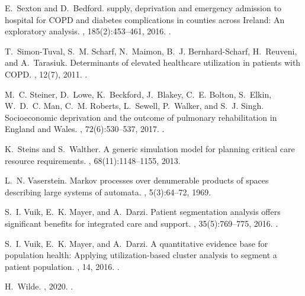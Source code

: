 \documentclass[11pt]{article}
\begin{document}
\begin{thebibliography}{10}
E.~Sexton and D.~Bedford.
 supply, deprivation and emergency admission to hospital for
  {COPD} and diabetes complications in counties across {Ireland}: An
  exploratory analysis.
, 185(2):453--461, 2016.
\newblock \href {https://doi.org/10.1007/s11845-015-1359-5}
  {}.

T.~Simon-Tuval, S.~M. Scharf, N.~Maimon, B.~J. Bernhard-Scharf, H.~Reuveni, and
  A.~Tarasiuk.
\newblock Determinants of elevated healthcare utilization in patients with
  {COPD}.
, 12(7), 2011.
\newblock \href {https://doi.org/10.1186/1465-9921-12-7}
  {}.

M.~C. Steiner, D.~Lowe, K.~Beckford, J.~Blakey, C.~E. Bolton, S.~Elkin,
  W.~D.~C. Man, C.~M. Roberts, L.~Sewell, P.~Walker, and S.~J. Singh.
\newblock Socioeconomic deprivation and the outcome of pulmonary rehabilitation
  in {England} and {Wales}.
, 72(6):530--537, 2017.
\newblock \href {https://doi.org/10.1136/thoraxjnl-2016-209376}
  {}.

K.~Steins and S.~Walther.
\newblock A generic simulation model for planning critical care resource
  requirements.
, 68(11):1148--1155, 2013.

L.~N. Vaserstein.
\newblock Markov processes over denumerable products of spaces describing large
  systems of automata.
, 5(3):64--72, 1969.

S.~I. Vuik, E.~K. Mayer, and A.~Darzi.
\newblock Patient segmentation analysis offers significant benefits for
  integrated care and support.
, 35(5):769--775, 2016.
\newblock \href {https://doi.org/10.1377/hlthaff.2015.1311}
  {}.

S.~I. Vuik, E.~K. Mayer, and A.~Darzi.
\newblock A quantitative evidence base for population health: Applying
  utilization-based cluster analysis to segment a patient population.
, 14, 2016.
\newblock \href {https://doi.org/10.1186/s12963-016-0115-z}
  {}.

H.~Wilde.
, 2020.
\newblock \href {https://doi.org/10.5281/zenodo.3937548}
  {}.


\end{thebibliography}
\end{document}

